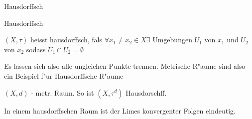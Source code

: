 \documentclass[class=article, crop=false]{standalone}
\begin{document}
\begin{zettel}{Hausdorffsch}
\begin{flashcard}[0xp1r0ny]{Hausdorffsch}
	\begin{definition}[hausdorffsch]
		$(X, \tau )$ heisst hausdorffsch, fals $\forall x_1 \neq x_2 \in  X \exists $ Umgebungen $U_1 $  von $x_1 $ und $U_2 $ von $x_2$ sodass $U_1 \cap U_2 = \emptyset$
	\end{definition}

\end{flashcard}
\begin{remark}
	Es lassen sich also alle ungleichen Punkte trennen. Metrische R"aume sind also ein Beispiel f"ur Hausdorffsche R"aume
\end{remark}
\begin{example}
	$(X,d) $ - metr. Raum. So ist $ (X,\tau^d) $ Hausdorschff.
\end{example}
\begin{lemma}
	In einem hausdorffschen Raum ist der Limes konvergenter Folgen eindeutig.
\end{lemma}
\end{zettel}
\end{document}
